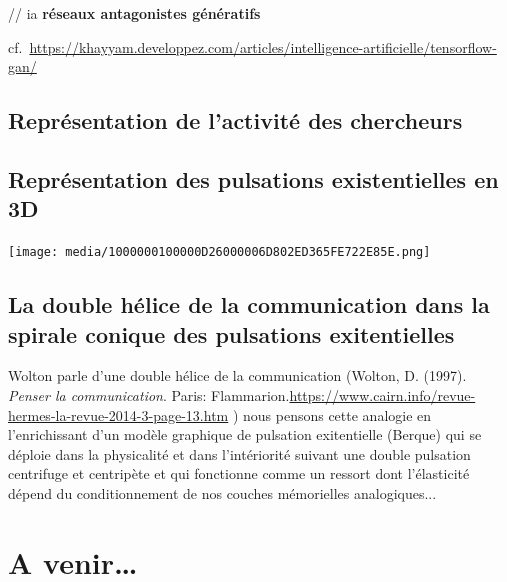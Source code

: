\documentclass[
  letterpaper,
  DIV=11,
  numbers=noendperiod]{scrreprt}
\begin{document}
// ia \textbf{réseaux antagonistes génératifs}

cf.~\url{https://khayyam.developpez.com/articles/intelligence-artificielle/tensorflow-gan/}

\hypertarget{sec-datavizActiChercheur}{%
\subsection*{Représentation de l'activité des
chercheurs}\label{sec-datavizActiChercheur}}

\hypertarget{sec-pulsaExi3D}{%
\subsection*{Représentation des pulsations existentielles en
3D}\label{sec-pulsaExi3D}}

\texttt{[image: media/1000000100000D26000006D802ED365FE722E85E.png]}

\hypertarget{la-double-huxe9lice-de-la-communication-dans-la-spirale-conique-des-pulsations-exitentielles}{%
\subsection*{La double hélice de la communication dans la spirale
conique des pulsations
exitentielles}\label{la-double-huxe9lice-de-la-communication-dans-la-spirale-conique-des-pulsations-exitentielles}}

Wolton parle d'une double hélice de la communication (Wolton, D. (1997).
\emph{Penser la communication}. Paris:
Flammarion.\url{https://www.cairn.info/revue-hermes-la-revue-2014-3-page-13.htm}
) nous pensons cette analogie en l'enrichissant d'un modèle graphique de
pulsation exitentielle (Berque) qui se déploie dans la physicalité et
dans l'intériorité suivant une double pulsation centrifuge et centripète
et qui fonctionne comme un ressort dont l'élasticité dépend du
conditionnement de nos couches mémorielles analogiques...

\hypertarget{a-venir}{%
\section*{A venir\ldots{}}\label{a-venir}}
\end{document}
